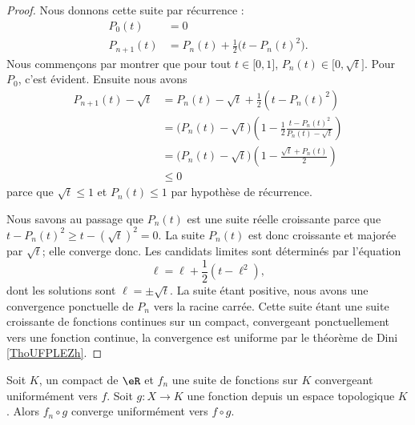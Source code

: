 \begin{proof}
    Nous donnons cette suite par récurrence :
    \begin{subequations}
        \begin{align}
            P_0(t)&=0\\
            P_{n+1}(t)&=P_n(t)+\frac{ 1 }{2}\big( t-P_n(t)^2 \big).
        \end{align}
    \end{subequations}
    Nous commençons par montrer que pour tout \( t\in \mathopen[ 0 , 1 \mathclose]\), \( P_n(t)\in\mathopen[ 0 , \sqrt{t} \mathclose]\). Pour \( P_0\), c'est évident. Ensuite nous avons
    \begin{subequations}
        \begin{align}
            P_{n+1}(t)-\sqrt{t}&=P_n(t)-\sqrt{t}+\frac{ 1 }{2}(t-P_n(t)^2)\\
            &=\big( P_n(t)-\sqrt{t} \big)\left( 1-\frac{ 1 }{2}\frac{ t-P_n(t)^2 }{ P_n(t)-\sqrt{t} } \right)\\
            &=\big( P_n(t)-\sqrt{t} \big)\left( 1-\frac{ \sqrt{t}+P_n(t) }{2} \right)\\
            &\leq 0
        \end{align}
    \end{subequations}
    parce que \( \sqrt{t} \leq 1\) et \( P_n(t)\leq 1\) par hypothèse de récurrence.

    Nous savons au passage que \( P_n(t)\) est une suite réelle croissante parce que \( t-P_n(t)^2\geq t-(\sqrt{t})^2=0\). La suite \( P_n(t)\) est donc croissante et majorée par \( \sqrt{t}\); elle converge donc. Les candidats limites sont déterminés par l'équation
    \begin{equation}
        \ell=\ell+\frac{ 1 }{2}(t-\ell^2),
    \end{equation}
    dont les solutions sont \( \ell=\pm\sqrt{t}\). La suite étant positive, nous avons une convergence ponctuelle de \( P_n\) vers la racine carrée. Cette suite étant une suite croissante de fonctions continues sur un compact, convergeant ponctuellement vers une fonction continue, la convergence est uniforme par le théorème de Dini \ref{ThoUFPLEZh}.
\end{proof}

\begin{lemma}           \label{LemUuxcqY}
    Soit \( K\), un compact de \( \eR\) et \( f_n\) une suite de fonctions sur \( K\) convergeant uniformément vers \( f\). Soit \( g\colon X\to K\) une fonction depuis un espace topologique \( K\). Alors \( f_n\circ g\) converge uniformément vers \( f\circ g\).
\end{lemma}


